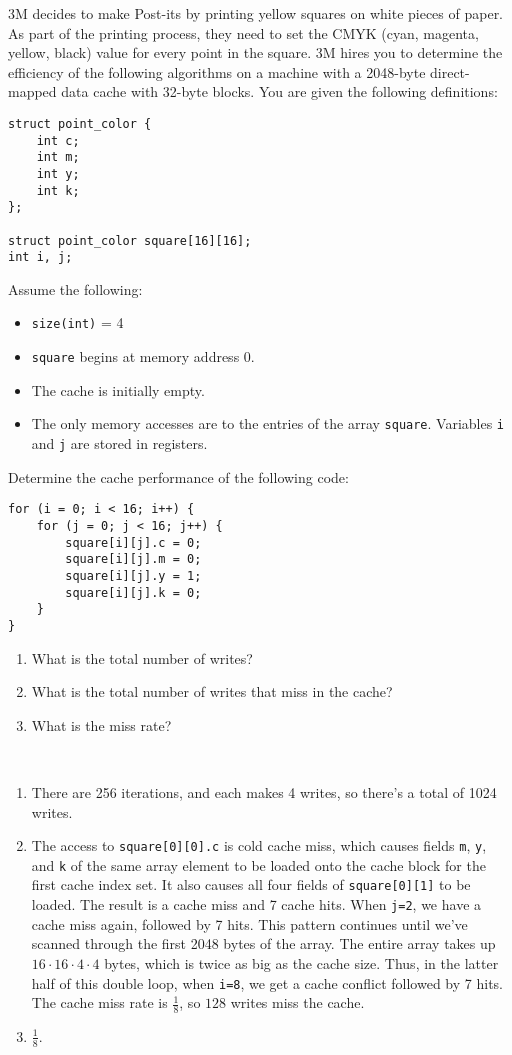 \documentclass[12pt]{article}
\newenvironment{ex}[2][Exercise]{\begin{trivlist}
		\item[\hskip \labelsep {\bfseries #1}\hskip \labelsep {\bfseries #2.}]}{\end{trivlist}}
\newenvironment{sol}[1][Solution]{\begin{trivlist}
		\item[\hskip \labelsep {\bfseries #1:}]}{\end{trivlist}}
\begin{document}
\begin{ex}{6.38}
	3M decides to make Post-its by printing yellow squares on white pieces of paper. As part of the printing
	process, they need to set the CMYK (cyan, magenta, yellow, black) value for every point in the square.
	3M hires you to determine the efficiency of the following algorithms on a machine with a 2048-byte
	direct-mapped data cache with 32-byte blocks. You are given the following definitions:
	\begin{lstlisting}
struct point_color {
	int c;
	int m;
	int y;
	int k;
};

struct point_color square[16][16];
int i, j;
	\end{lstlisting}
	Assume the following:
	\begin{itemize}
		\item \texttt{size(int)} = 4
		\item \texttt{square} begins at memory address 0.
		\item The cache is initially empty.
		\item The only memory accesses are to the entries of the array \texttt{square}. Variables \texttt{i}
		and \texttt{j} are stored in registers.
	\end{itemize}
	Determine the cache performance of the following code:
	\begin{lstlisting}
for (i = 0; i < 16; i++) {
	for (j = 0; j < 16; j++) {
		square[i][j].c = 0;
		square[i][j].m = 0;
		square[i][j].y = 1;
		square[i][j].k = 0;
	}
}
	\end{lstlisting}
	\begin{enumerate}[label=(\alph*)]
		\item What is the total number of writes?
		\item What is the total number of writes that miss in the cache?
		\item What is the miss rate?
	\end{enumerate}
\end{ex}

\begin{sol}
	\
	\begin{enumerate}[label=(\alph*)]
		\item There are 256 iterations, and each makes 4 writes, so there's a total of 1024 writes.
		\item The access to \texttt{square[0][0].c} is  cold cache miss, which causes fields
		\texttt{m}, \texttt{y}, and \texttt{k} of the same array element to be loaded onto the cache block
		for the first cache index set. It also causes all four fields of \texttt{square[0][1]} to
		be loaded. The result is a cache miss and 7 cache hits. When \texttt{j=2}, we have a cache miss
		again, followed by 7 hits. This pattern continues until we've scanned through the first 2048
		bytes of the array. The entire array takes up $16\cdot 16\cdot 4\cdot 4$ bytes, which is twice as big
		as the cache size. Thus, in the latter half of this double loop, when \texttt{i=8},
		we get a cache conflict followed by 7 hits. The cache miss rate is $\frac{1}{8}$, so
		$128$ writes miss the cache.
		\item $\frac{1}{8}$.
	\end{enumerate}
\end{sol}
\end{document}

